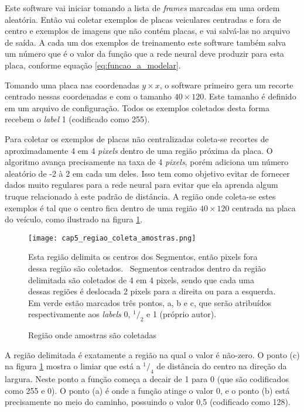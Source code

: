 Este software vai iniciar tomando a lista de \emph{frames} marcadas em
uma ordem
aleatória. Então vai coletar exemplos de placas veiculares centradas e fora
de centro e exemplos de imagens que não contém placas, e vai salvá-las no
arquivo de saída. A cada um dos exemplos de treinamento este software
também salva um número que é o valor da função que a rede neural deve
produzir para esta placa, conforme equação \ref{eq:funcao_a_modelar}.

Tomando uma placa nas coordenadas $y \times x$, o software primeiro gera um
recorte centrado nessas coordenadas e com o tamanho $40 \times 120$. Este
tamanho é definido em um arquivo de configuração. Todos os exemplos
coletados desta forma recebem o \emph{label} 1 (codificado como 255).

Para coletar os exemplos de placas não centralizadas coleta-se recortes de
aproximadamente 4 em 4 \emph{pixels} dentro de uma região próxima da placa. O
algoritmo avança precisamente na taxa de 4 \emph{pixels}, porém adiciona um
número aleatório de -2 à 2 em cada um deles. Isso tem como objetivo evitar de
fornecer dados muito regulares para a rede neural para evitar que ela
aprenda algum truque relacionado à este padrão de distância. A região onde
coleta-se estes exemplos é tal que o centro fica dentro de uma região
$40 \times 120$ centrada na placa do veículo, como ilustrado na figura
\ref{fig:cap5_regiao_coleta_amostras}.

\begin{figure}[!htb]
	\centering
	\texttt{[image: cap5\_regiao\_coleta\_amostras.png]}
	\caption{Região onde amostras são coletadas}
	\label{fig:cap5_regiao_coleta_amostras}
	Esta região delimita os centros dos Segmentos, então pixels fora dessa
	região são coletados.  Segmentos centrados dentro da região delimitada são
	coletados de 4 em 4 pixels, sendo que cada uma dessas regiões é deslocada 2
	pixels para a direita ou para a esquerda. Em verde estão marcados três
	pontos, a, b e c, que serão atribuídos respectivamente aos \emph{labels} 0,
	$^1/_2$ e 1 (próprio autor).
\end{figure}

A região delimitada é exatamente a região na qual o valor é não-zero. O ponto
(c) na figura \ref{fig:cap5_regiao_coleta_amostras} mostra o limiar que está
a $^1/_4$ de distância do centro na direção da largura. Neste ponto a função
começa a decair de 1 para 0 (que são codificados como 255 e 0). O ponto (a)
é onde a função atinge o valor 0, e o ponto (b) está precisamente no
meio do caminho, possuindo o valor 0,5 (codificado como 128).

